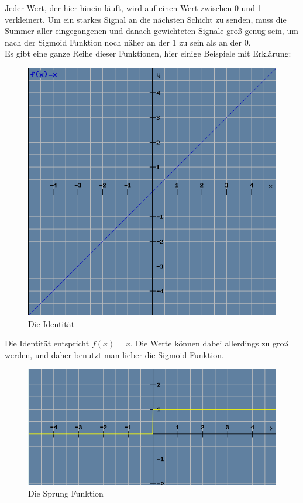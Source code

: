 \documentclass[12pt]{article}
\begin{document}
Jeder Wert, der hier hinein läuft, wird auf einen Wert zwischen 0 und 1 verkleinert. 
Um ein starkes Signal an die nächsten Schicht zu senden, muss die Summer aller eingegangenen und danach gewichteten Signale groß genug sein, um nach der Sigmoid Funktion noch näher an der 1 zu sein als an der 0. 
\\Es gibt eine ganze Reihe dieser Funktionen, hier einige Beispiele mit Erklärung:
\begin{figure}[H]
\centering
\includegraphics[scale=0.5]{./Images/Pasted image 20230912194736.png}
\caption{Die Identität}
\label{Die Identität}
\end{figure}
Die Identität entspricht $f(x) = x$. Die Werte können dabei allerdings zu groß werden, und daher benutzt man lieber die Sigmoid Funktion. 
\begin{figure}[H]
\centering
\includegraphics[scale=0.60]{./Images/Pasted image 20230912195705.png}
\caption{Die Sprung Funktion}
\label{Die Sprung Funktion}
\end{figure}
\end{document}
